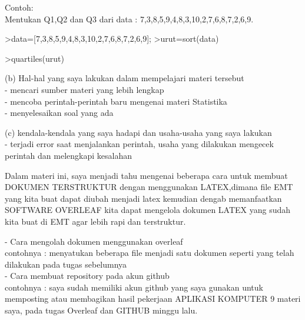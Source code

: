 \documentclass[a4paper,10pt]{article}
\begin{document}
\begin{eulernotebook}
\begin{eulercomment}
\begin{eulercomment}
\begin{eulercomment}
\begin{eulercomment}
\begin{eulercomment}
\begin{eulercomment}
\begin{eulercomment}
Contoh:\\
Mentukan Q1,Q2 dan Q3 dari data : 7,3,8,5,9,4,8,3,10,2,7,6,8,7,2,6,9.
\end{eulercomment}
\begin{eulerprompt}
>data=[7,3,8,5,9,4,8,3,10,2,7,6,8,7,2,6,9];
>urut=sort(data)
\end{eulerprompt}
\begin{euleroutput}
  [2,  2,  3,  3,  4,  5,  6,  6,  7,  7,  7,  8,  8,  8,  9,  9,  10]
\end{euleroutput}
\begin{eulerprompt}
>quartiles(urut)
\end{eulerprompt}
\begin{euleroutput}
  [2,  3.5,  7,  8,  10]
\end{euleroutput}
\begin{eulercomment}
(b) Hal-hal yang saya lakukan dalam mempelajari materi tersebut\\
- mencari sumber materi yang lebih lengkap\\
- mencoba perintah-perintah baru mengenai materi Statistika\\
- menyelesaikan soal yang ada

(c) kendala-kendala yang saya hadapi dan usaha-usaha yang saya lakukan\\
- terjadi error saat menjalankan perintah, usaha yang dilakukan
mengecek perintah dan melengkapi kesalahan
\end{eulercomment}
\begin{eulercomment}

\begin{eulercomment}
\begin{eulercomment}
Dalam materi ini, saya menjadi tahu mengenai beberapa cara untuk
membuat DOKUMEN TERSTRUKTUR dengan menggunakan LATEX,dimana file EMT
yang kita buat dapat diubah menjadi latex kemudian dengab memanfaatkan
SOFTWARE OVERLEAF kita dapat mengelola dokumen LATEX yang sudah kita
buat di EMT agar lebih rapi dan terstruktur.

- Cara mengolah dokumen menggunakan overleaf\\
contohnya : menyatukan beberapa file menjadi satu dokumen seperti yang
telah dilakukan pada tugas sebelumnya\\
- Cara membuat repository pada akun github\\
contohnya : saya sudah memiliki akun github yang saya gunakan untuk
memposting atau membagikan hasil pekerjaan APLIKASI KOMPUTER 9 materi
saya, pada tugas Overleaf dan GITHUB minggu lalu.



\end{eulercomment}
\end{eulercomment}
\end{eulercomment}
\end{eulercomment}
\end{eulercomment}
\end{eulercomment}
\end{eulercomment}
\end{eulercomment}
\end{eulercomment}
\end{eulernotebook}
\end{document}
